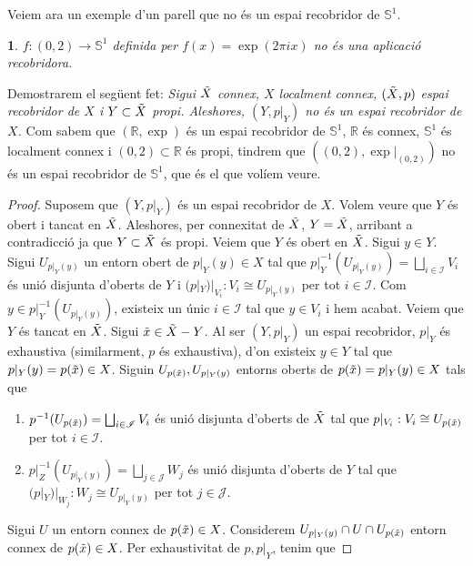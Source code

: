 \documentclass[compress,10pt]{article}
\newtheorem{enunciat}{}
\theoremstyle{definition}
\begin{document}
Veiem ara un exemple d'un parell que no és un espai recobridor de $\mathbb{S}^{1}$.
\begin{enunciat}
    $f:(0,2)\rightarrow\mathbb{S}^{1}$ definida per $f(x)=\exp(2\pi ix)$ no és una aplicació recobridora.
\end{enunciat}
Demostrarem el següent fet: \textit{Sigui $\Tilde{X}$ connex, $X$ localment connex, $(\Tilde{X},p)$ espai recobridor de $X$ i $Y\subset\Tilde{X}$ propi. Aleshores, $(Y,p|_{Y})$ no és un espai recobridor de $X$.}\newline
Com sabem que $(\mathbb{R},\exp)$ és un espai recobridor de $\mathbb{S}^{1}$, $\mathbb{R}$ és connex, $\mathbb{S}^{1}$ és localment connex i $(0,2)\subset\mathbb{R}$ és propi, tindrem que $((0,2),\exp|_{(0,2)})$ no és un espai recobridor de $\mathbb{S}^{1}$, que és el que volíem veure.
\begin{proof}
    Suposem que $(Y,p|_{Y})$ és un espai recobridor de $X$. Volem veure que $Y$ és obert i tancat en $\Tilde{X}$. Aleshores, per connexitat de $\Tilde{X}$, $Y=\Tilde{X}$, arribant a contradicció ja que $Y\subset\Tilde{X}$ és propi.\newline
    Veiem que $Y$ és obert en $\Tilde{X}$. Sigui $y\in Y$. Sigui $U_{p|_{Y}(y)}$ un entorn obert de $p|_{Y}(y)\in X$ tal que $p|_{Y}^{-1}(U_{p|_{Y}(y)})=\bigsqcup_{i\in\mathscr{I}}V_{i}$ és unió disjunta d'oberts de $Y$ i $(p|_{Y})|_{V_{i}}:V_{i}\cong U_{p|_{Y}(y)}$ per tot $i\in\mathscr{I}$. Com $y\in p|_{Y}^{-1}(U_{p|_{Y}(y)})$, existeix un únic $i\in\mathscr{I}$ tal que $y\in V_{i}$ i hem acabat.\newline
    Veiem que $Y$ és tancat en $\Tilde{X}$. Sigui $\Tilde{x}\in\Tilde{X}-Y$. Al ser $(Y,p|_{Y})$ un espai recobridor, $p|_{Y}$ és exhaustiva (similarment, $p$ és exhaustiva), d'on existeix $y\in Y$ tal que $p|_{Y}(y)=p(\Tilde{x})\in X$. Siguin $U_{p(\Tilde{x})},U_{p|_{Y}(y)}$ entorns oberts de $p(\Tilde{x})=p|_{Y}(y)\in X$ tals que 
    \begin{enumerate}
        \item $p^{-1}(U_{p(\Tilde{x})})=\bigsqcup_{i\in\mathscr{I}}V_{i}$ és unió disjunta d'oberts de $\Tilde{X}$ tal que $p|_{V_{i}}:V_{i}\cong U_{p(\Tilde{x})}$ per tot $i\in\mathscr{I}$.
        \item $p|_{Z}^{-1}(U_{p|_{Y}(y)})=\bigsqcup_{j\in\mathscr{J}}W_{j}$ és unió disjunta d'oberts de $Y$ tal que $(p|_{Y})|_{W_{j}}:W_{j}\cong U_{p|_{Y}(y)}$ per tot $j\in\mathscr{J}$.
    \end{enumerate}
    Sigui $U$ un entorn connex de $p(\Tilde{x})\in X$. Considerem $U_{p|_{Y}(y)}\cap U\cap U_{p(\Tilde{x})}$ entorn connex de $p(\Tilde{x})\in X$. Per exhaustivitat de $p,p|_{Y}$, tenim que 

\end{proof}
\end{document}
